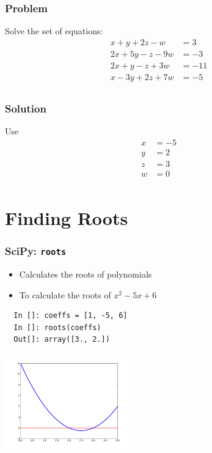 \documentclass[14pt,compress]{beamer}
\newcounter{time}
\newcommand{\inctime}[1]{\addtocounter{time}{#1}{\tiny \thetime\ m}}
\newcommand{\typ}[1]{\lstinline{#1}}
\newcommand{\kwrd}[1]{ \texttt{\textbf{\color{blue}{#1}}}  }
\begin{document}
\begin{frame}[fragile]
\frametitle{Problem}
Solve the set of equations:
\begin{align*}
  x + y + 2z -w & = 3\\
  2x + 5y - z - 9w & = -3\\
  2x + y -z + 3w & = -11 \\
  x - 3y + 2z + 7w & = -5\\
\end{align*}
\end{frame}

\begin{frame}[fragile]
\frametitle{Solution}
Use \kwrd{solve()}
\begin{align*}
  x & = -5\\
  y & = 2\\
  z & = 3\\
  w & = 0\\
\end{align*}
\inctime{5}
\end{frame}

\section{Finding Roots}

\begin{frame}[fragile]
\frametitle{SciPy: \typ{roots}}
\begin{itemize}
\item Calculates the roots of polynomials
\item To calculate the roots of $x^2-5x+6$
\end{itemize}
\begin{lstlisting}
  In []: coeffs = [1, -5, 6]
  In []: roots(coeffs)
  Out[]: array([3., 2.])
\end{lstlisting}
\vspace*{-.2in}
\begin{center}
\includegraphics[height=1.6in, interpolate=true]{data/roots}
\end{center}
\end{frame}
\end{document}
